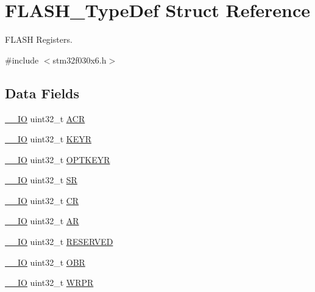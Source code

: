 \hypertarget{struct_f_l_a_s_h___type_def}{}\section{F\+L\+A\+S\+H\+\_\+\+Type\+Def Struct Reference}
\label{struct_f_l_a_s_h___type_def}


F\+L\+A\+SH Registers.  




{\ttfamily \#include $<$stm32f030x6.\+h$>$}

\subsection*{Data Fields}
\begin{DoxyCompactItemize}
\item 
\hyperlink{core__sc300_8h_aec43007d9998a0a0e01faede4133d6be}{\+\_\+\+\_\+\+IO} uint32\+\_\+t \hyperlink{struct_f_l_a_s_h___type_def_a9cb55206b29a8c16354747c556ab8bea}{A\+CR}
\item 
\hyperlink{core__sc300_8h_aec43007d9998a0a0e01faede4133d6be}{\+\_\+\+\_\+\+IO} uint32\+\_\+t \hyperlink{struct_f_l_a_s_h___type_def_a84c491be6c66b1d5b6a2efd0740b3d0c}{K\+E\+YR}
\item 
\hyperlink{core__sc300_8h_aec43007d9998a0a0e01faede4133d6be}{\+\_\+\+\_\+\+IO} uint32\+\_\+t \hyperlink{struct_f_l_a_s_h___type_def_afc4900646681dfe1ca43133d376c4423}{O\+P\+T\+K\+E\+YR}
\item 
\hyperlink{core__sc300_8h_aec43007d9998a0a0e01faede4133d6be}{\+\_\+\+\_\+\+IO} uint32\+\_\+t \hyperlink{struct_f_l_a_s_h___type_def_af6aca2bbd40c0fb6df7c3aebe224a360}{SR}
\item 
\hyperlink{core__sc300_8h_aec43007d9998a0a0e01faede4133d6be}{\+\_\+\+\_\+\+IO} uint32\+\_\+t \hyperlink{struct_f_l_a_s_h___type_def_ab40c89c59391aaa9d9a8ec011dd0907a}{CR}
\item 
\hyperlink{core__sc300_8h_aec43007d9998a0a0e01faede4133d6be}{\+\_\+\+\_\+\+IO} uint32\+\_\+t \hyperlink{struct_f_l_a_s_h___type_def_a2ac50357d1ebac2949d27bfc4855e6a4}{AR}
\item 
\hyperlink{core__sc300_8h_aec43007d9998a0a0e01faede4133d6be}{\+\_\+\+\_\+\+IO} uint32\+\_\+t \hyperlink{struct_f_l_a_s_h___type_def_ad21eb922f00d583e80943def27a0f05c}{R\+E\+S\+E\+R\+V\+ED}
\item 
\hyperlink{core__sc300_8h_aec43007d9998a0a0e01faede4133d6be}{\+\_\+\+\_\+\+IO} uint32\+\_\+t \hyperlink{struct_f_l_a_s_h___type_def_aadec05237ee04c5a913c7ca9cd944f38}{O\+BR}
\item 
\hyperlink{core__sc300_8h_aec43007d9998a0a0e01faede4133d6be}{\+\_\+\+\_\+\+IO} uint32\+\_\+t \hyperlink{struct_f_l_a_s_h___type_def_a9bc0e514c0860e3c153a6cfa72bdf1c3}{W\+R\+PR}
\end{DoxyCompactItemize}


